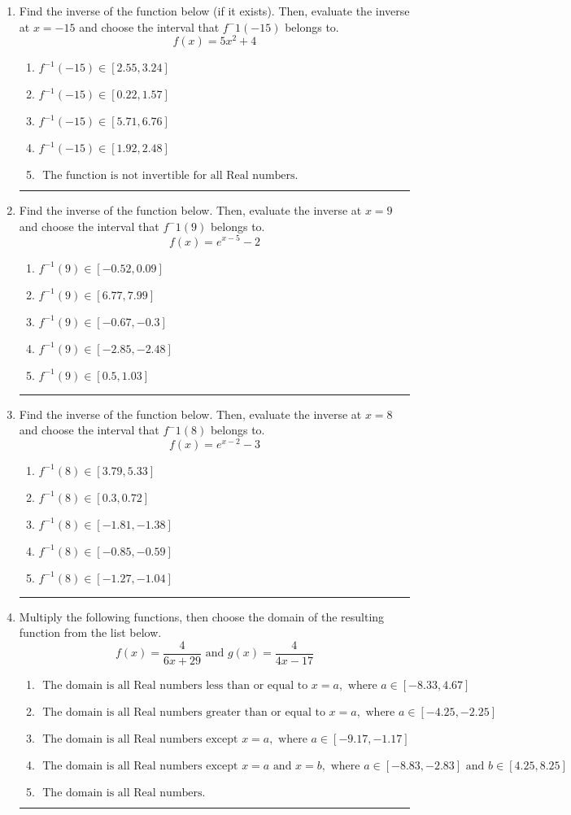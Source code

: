 \documentclass[14pt]{extbook}
\newcommand{\litem}[1]{\item#1\hspace*{-1cm}\rule{\textwidth}{0.4pt}}
\begin{document}
\begin{enumerate}
\litem{
Find the inverse of the function below (if it exists). Then, evaluate the inverse at $x = -15$ and choose the interval that $f^-1(-15)$ belongs to.\[ f(x) = 5 x^2 + 4 \]\begin{enumerate}[label=\Alph*.]
\item \( f^{-1}(-15) \in [2.55, 3.24] \)
\item \( f^{-1}(-15) \in [0.22, 1.57] \)
\item \( f^{-1}(-15) \in [5.71, 6.76] \)
\item \( f^{-1}(-15) \in [1.92, 2.48] \)
\item \( \text{ The function is not invertible for all Real numbers. } \)

\end{enumerate} }
\litem{
Find the inverse of the function below. Then, evaluate the inverse at $x = 9$ and choose the interval that $f^-1(9)$ belongs to.\[ f(x) = e^{x-5}-2 \]\begin{enumerate}[label=\Alph*.]
\item \( f^{-1}(9) \in [-0.52, 0.09] \)
\item \( f^{-1}(9) \in [6.77, 7.99] \)
\item \( f^{-1}(9) \in [-0.67, -0.3] \)
\item \( f^{-1}(9) \in [-2.85, -2.48] \)
\item \( f^{-1}(9) \in [0.5, 1.03] \)

\end{enumerate} }
\litem{
Find the inverse of the function below. Then, evaluate the inverse at $x = 8$ and choose the interval that $f^-1(8)$ belongs to.\[ f(x) = e^{x-2}-3 \]\begin{enumerate}[label=\Alph*.]
\item \( f^{-1}(8) \in [3.79, 5.33] \)
\item \( f^{-1}(8) \in [0.3, 0.72] \)
\item \( f^{-1}(8) \in [-1.81, -1.38] \)
\item \( f^{-1}(8) \in [-0.85, -0.59] \)
\item \( f^{-1}(8) \in [-1.27, -1.04] \)

\end{enumerate} }
\litem{
Multiply the following functions, then choose the domain of the resulting function from the list below.\[ f(x) = \frac{4}{6x+29} \text{ and } g(x) = \frac{4}{4x-17} \]\begin{enumerate}[label=\Alph*.]
\item \( \text{ The domain is all Real numbers less than or equal to } x = a, \text{ where } a \in [-8.33, 4.67] \)
\item \( \text{ The domain is all Real numbers greater than or equal to } x = a, \text{ where } a \in [-4.25, -2.25] \)
\item \( \text{ The domain is all Real numbers except } x = a, \text{ where } a \in [-9.17, -1.17] \)
\item \( \text{ The domain is all Real numbers except } x = a \text{ and } x = b, \text{ where } a \in [-8.83, -2.83] \text{ and } b \in [4.25, 8.25] \)
\item \( \text{ The domain is all Real numbers. } \)


\end{enumerate}}
\end{enumerate}
\end{document}
